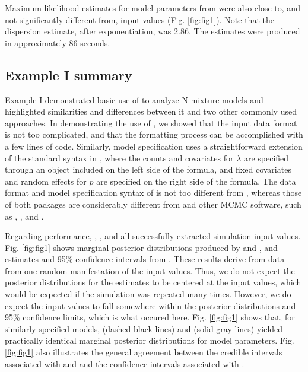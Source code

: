 \documentclass[codesnippet]{jss}
\begin{document}
Maximum likelihood estimates for model parameters from  were also close to, and not significantly different from, input values (Fig. \ref{fig:fig1}). Note that the dispersion estimate, after exponentiation, was 2.86. The  estimates were produced in approximately 86 seconds.

\subsection[Example I summary]{Example I summary}
Example I demonstrated basic use of  to analyze N-mixture models and highlighted similarities and differences between it and two other commonly used approaches. In demonstrating the use of , we showed that the input data format is not too complicated, and that the formatting process can be accomplished with a few lines of code. Similarly, model specification uses a straightforward extension of the standard syntax in , where the counts and covariates for $\lambda$ are specified through an  object included on the left side of the formula, and fixed covariates and random effects for $p$ are specified on the right side of the formula. The data format and model specification syntax of  is not too different from , whereas those of both packages are considerably different from  and other MCMC software, such as , , and .

Regarding performance, , , and  all successfully extracted simulation input values. Fig. \ref{fig:fig1} shows marginal posterior distributions produced by  and , and estimates and 95\% confidence intervals from . These results derive from data from one random manifestation of the input values. Thus, we do not expect the posterior distributions for the estimates to be centered at the input values, which would be expected if the simulation was repeated many times. However, we do expect the input values to fall somewhere within the posterior distributions and 95\% confidence limits, which is what occured here. Fig. \ref{fig:fig1} shows that, for similarly specified models,  (dashed black lines) and  (solid gray lines) yielded practically identical marginal posterior distributions for model parameters. Fig. \ref{fig:fig1} also illustrates the general agreement between the credible intervals associated with  and  and the confidence intervals associated with .
\end{document}
